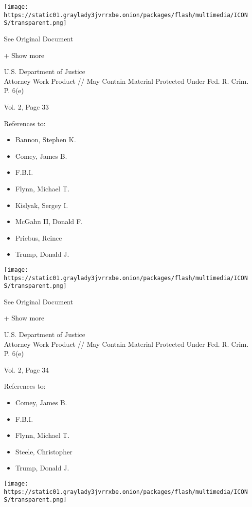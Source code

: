 \protect\hyperlink{}{}

\texttt{[image: https://static01.graylady3jvrrxbe.onion/packages/flash/multimedia/ICONS/transparent.png]}

See Original Document

+ Show more

U.S. Department of Justice\\
Attorney Work Product // May Contain Material Protected Under Fed. R.
Crim. P. 6(e)

Vol. 2, Page 33

References to:

\begin{itemize}
\tightlist
\item
  Bannon, Stephen K.
\item
  Comey, James B.
\item
  F.B.I.
\item
  Flynn, Michael T.
\item
  Kislyak, Sergey I.
\item
  McGahn II, Donald F.
\item
  Priebus, Reince
\item
  Trump, Donald J.
\end{itemize}

\protect\hyperlink{}{}

\texttt{[image: https://static01.graylady3jvrrxbe.onion/packages/flash/multimedia/ICONS/transparent.png]}

See Original Document

+ Show more

U.S. Department of Justice\\
Attorney Work Product // May Contain Material Protected Under Fed. R.
Crim. P. 6(e)

Vol. 2, Page 34

References to:

\begin{itemize}
\tightlist
\item
  Comey, James B.
\item
  F.B.I.
\item
  Flynn, Michael T.
\item
  Steele, Christopher
\item
  Trump, Donald J.
\end{itemize}

\protect\hyperlink{}{}

\texttt{[image: https://static01.graylady3jvrrxbe.onion/packages/flash/multimedia/ICONS/transparent.png]}

